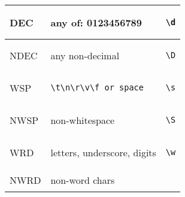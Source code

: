 %
%
\tablelasttail{%
\bottomrule}
\begin{xtabular}{lll}
DEC &  any of: 0123456789 &
\begin{minipage}{0.5in}\begin{verbatim}
\d
\end{verbatim}\end{minipage} \\
\midrule
NDEC & any non-decimal &
\begin{minipage}{0.5in}\begin{verbatim}
\D
\end{verbatim}\end{minipage} \\
\midrule
WSP &
\begin{minipage}{0.5in}\begin{verbatim}
\t\n\r\v\f or space
\end{verbatim}\end{minipage} &
\begin{minipage}{0.5in}\begin{verbatim}
\s
\end{verbatim}\end{minipage} \\
\midrule
NWSP & non-whitespace &
\begin{minipage}{0.5in}\begin{verbatim}
\S
\end{verbatim}\end{minipage} \\
\midrule
WRD & letters, underscore, digits &
\begin{minipage}{0.5in}\begin{verbatim}
\w
\end{verbatim}\end{minipage} \\
\midrule
NWRD & non-word chars &
\begin{minipage}{0.5in}\begin{verbatim}

\end{verbatim}
\end{minipage}
\end{xtabular}
